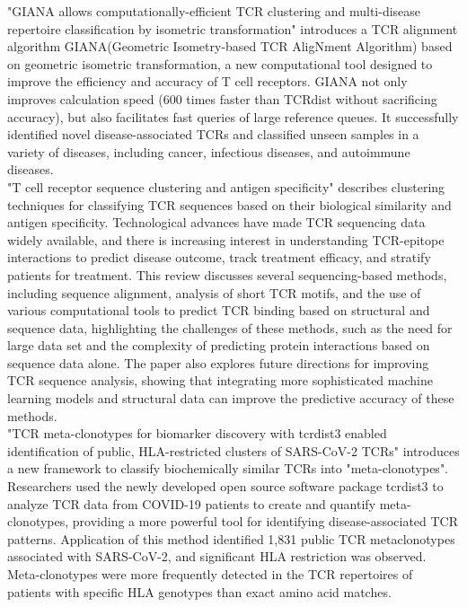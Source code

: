 \documentclass[conference]{IEEEtran}
\begin{document}
	"GIANA allows computationally-efficient TCR clustering and multi-disease repertoire classification by isometric transformation" \cite{b1} introduces a TCR alignment algorithm GIANA(Geometric Isometry-based TCR AligNment Algorithm) based on geometric isometric transformation, a new computational tool designed to improve the efficiency and accuracy of T cell receptors. GIANA not only improves calculation speed (600 times faster than TCRdist without sacrificing accuracy), but also facilitates fast queries of large reference queues. It successfully identified novel disease-associated TCRs and classified unseen samples in a variety of diseases, including cancer, infectious diseases, and autoimmune diseases.
    \\

    "T cell receptor sequence clustering and antigen specificity" \cite{b2} describes clustering techniques for classifying TCR sequences based on their biological similarity and antigen specificity. Technological advances have made TCR sequencing data widely available, and there is increasing interest in understanding TCR-epitope interactions to predict disease outcome, track treatment efficacy, and stratify patients for treatment. This review discusses several sequencing-based methods, including sequence alignment, analysis of short TCR motifs, and the use of various computational tools to predict TCR binding based on structural and sequence data, highlighting the challenges of these methods, such as the need for large data set and the complexity of predicting protein interactions based on sequence data alone. The paper also explores future directions for improving TCR sequence analysis, showing that integrating more sophisticated machine learning models and structural data can improve the predictive accuracy of these methods.
    \\
	
	"TCR meta-clonotypes for biomarker discovery with tcrdist3 enabled identification of public, HLA-restricted clusters of SARS-CoV-2 TCRs" \cite{b3} introduces a new framework to classify biochemically similar TCRs into "meta-clonotypes". Researchers used the newly developed open source software package tcrdist3 to analyze TCR data from COVID-19 patients to create and quantify meta-clonotypes, providing a more powerful tool for identifying disease-associated TCR patterns. Application of this method identified 1,831 public TCR metaclonotypes associated with SARS-CoV-2, and significant HLA restriction was observed. Meta-clonotypes were more frequently detected in the TCR repertoires of patients with specific HLA genotypes than exact amino acid matches.
	
\end{document}
